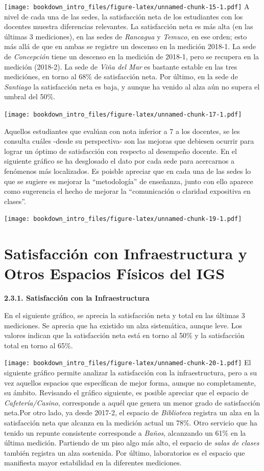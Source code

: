 \documentclass[]{book}
\begin{document}
\texttt{[image: bookdown\_intro\_files/figure-latex/unnamed-chunk-15-1.pdf]}
A nivel de cada una de las sedes, la satisfacción neta de los
estudiantes con los docentes muestra diferencias relevantes. La
satisfacción neta es más alta (en las últimas 3 mediciones), en las
sedes de \emph{Rancagua} y \emph{Temuco}, en ese orden; esto más allá de
que en ambas se registre un descenso en la medición 2018-1. La sede de
\emph{Concepción} tiene un descenso en la medición de 2018-1, pero se
recupera en la medición (2018-2). La sede de \emph{Viña del Mar} es
bastante estable en las tres mediciónes, en torno al 68\% de
satisfacción neta. Por último, en la sede de \emph{Santiago} la
satisfacción neta es baja, y aunque ha venido al alza aún no supera el
umbral del 50\%.

\texttt{[image: bookdown\_intro\_files/figure-latex/unnamed-chunk-17-1.pdf]}

Aquellos estudiantes que evalúan con nota inferior a 7 a los docentes,
se les consulta cuáles -desde su perspectiva- son las mejoras que
debiesen ocurrir para lograr un óptimo de satisfacción con respecto al
desempeño docente. En el siguiente gráfico se ha desglosado el dato por
cada sede para acercarnos a fenómenos más localizados. Es poisble
apreciar que en cada una de las sedes lo que se sugiere es mejorar la
``metodología'' de enseñanza, junto con ello aparece como sugerencia el
hecho de mejorar la ``comunicación o claridad expositiva en clases''.

\texttt{[image: bookdown\_intro\_files/figure-latex/unnamed-chunk-19-1.pdf]}

\section{Satisfacción con Infraestructura y Otros Espacios Físicos del
IGS}\label{satisfaccion-con-infraestructura-y-otros-espacios-fisicos-del-igs}

\textbf{2.3.1. Satisfacción con la Infraestructura}

En el siguiente gráfico, se aprecia la satisfacción neta y total en las
últimas 3 mediciones. Se aprecia que ha existido un alza sistemática,
aunque leve. Los valores indican que la satisfacción neta está en torno
al 50\% y la satisfacción total en torno al 65\%.

\texttt{[image: bookdown\_intro\_files/figure-latex/unnamed-chunk-20-1.pdf]}
El siguiente gráfico permite analizar la satisfacción con la
infraestructura, pero a su vez aquellos espacios que específican de
mejor forma, aunque no completamente, su ámbito. Revisando el gráfico
siguiente, es posible apreciar que el espacio de
\emph{Cafetería/Casino}, corresponde a aquél que genera un menor grado
de satisfacción neta.Por otro lado, ya desde 2017-2, el espacio de
\emph{Biblioteca} registra un alza en la satisfacción neta que alcanza
en la medición actual un 78\%. Otro servicio que ha tenido un repunte
consistente corresponde a \emph{Baños}, alcanzando un 61\% en la última
medición. Partiendo de un piso algo más alto, el espacio de \emph{salas
de clases} también registra un alza sostenida. Por último, laboratorios
es el espacio que manifiesta mayor estabilidad en la diferentes
mediciones.
\end{document}
